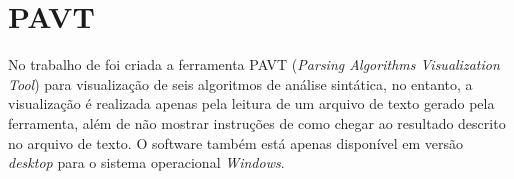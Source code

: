 \begin{figure}[ht]
    \captionsetup{width=16cm}
\end{figure}
\begin{figure}[ht]
    \captionsetup{width=16cm}
\end{figure}
\FloatBarrier

\section{PAVT}
No trabalho de \textcite{sangal2018pavt} foi criada a ferramenta PAVT (\textit{Parsing Algorithms Visualization Tool}) para visualização de seis algoritmos de análise sintática, no entanto, a visualização é realizada apenas pela leitura de um arquivo de texto gerado pela ferramenta, além de não mostrar instruções de como chegar ao resultado descrito no arquivo de texto. O software também está apenas disponível em versão \textit{desktop} para o sistema operacional \textit{Windows}.

